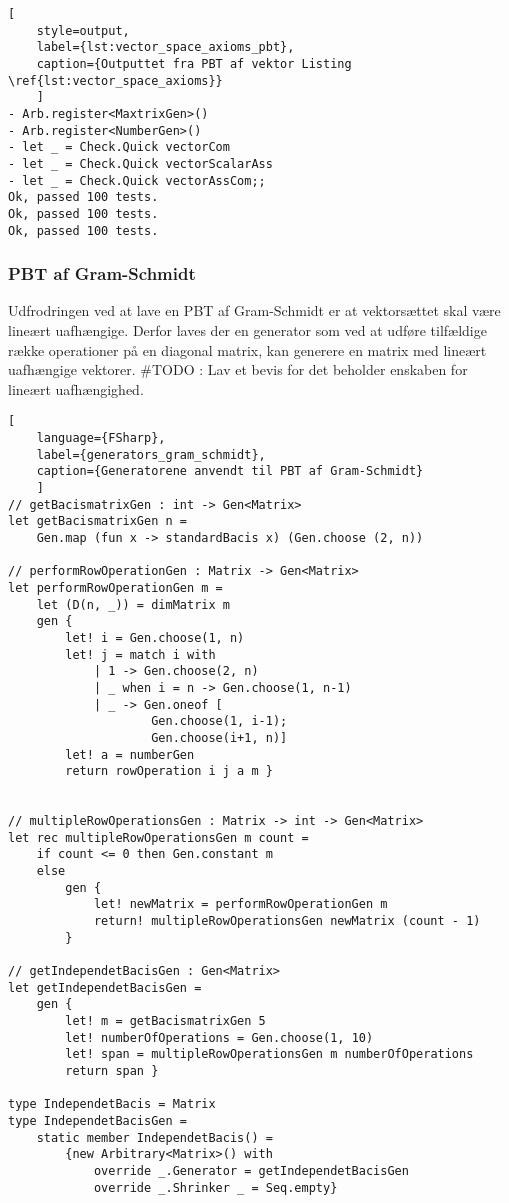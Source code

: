 \begin{lstlisting}[
    style=output, 
    label={lst:vector_space_axioms_pbt}, 
    caption={Outputtet fra PBT af vektor Listing \ref{lst:vector_space_axioms}}
    ]
- Arb.register<MaxtrixGen>()
- Arb.register<NumberGen>()
- let _ = Check.Quick vectorCom
- let _ = Check.Quick vectorScalarAss
- let _ = Check.Quick vectorAssCom;;
Ok, passed 100 tests.
Ok, passed 100 tests.
Ok, passed 100 tests.
\end{lstlisting}

\subsubsection{PBT af Gram-Schmidt}\label{sec:pbt_gram_schmidt}
Udfrodringen ved at lave en PBT af Gram-Schmidt er at vektorsættet skal være lineært uafhængige. Derfor laves der en generator som ved at udføre tilfældige række operationer på en diagonal matrix, kan generere en matrix med lineært uafhængige vektorer. 
\#TODO : Lav et bevis for det beholder enskaben for lineært uafhængighed.

\begin{lstlisting}[
    language={FSharp}, 
    label={generators_gram_schmidt}, 
    caption={Generatorene anvendt til PBT af Gram-Schmidt}
    ]
// getBacismatrixGen : int -> Gen<Matrix>
let getBacismatrixGen n =
    Gen.map (fun x -> standardBacis x) (Gen.choose (2, n))

// performRowOperationGen : Matrix -> Gen<Matrix>
let performRowOperationGen m =
    let (D(n, _)) = dimMatrix m
    gen { 
        let! i = Gen.choose(1, n)
        let! j = match i with
            | 1 -> Gen.choose(2, n)
            | _ when i = n -> Gen.choose(1, n-1)
            | _ -> Gen.oneof [
                    Gen.choose(1, i-1); 
                    Gen.choose(i+1, n)]
        let! a = numberGen
        return rowOperation i j a m }


// multipleRowOperationsGen : Matrix -> int -> Gen<Matrix>
let rec multipleRowOperationsGen m count =
    if count <= 0 then Gen.constant m
    else
        gen {
            let! newMatrix = performRowOperationGen m
            return! multipleRowOperationsGen newMatrix (count - 1)
        }

// getIndependetBacisGen : Gen<Matrix>
let getIndependetBacisGen =
    gen { 
        let! m = getBacismatrixGen 5
        let! numberOfOperations = Gen.choose(1, 10)
        let! span = multipleRowOperationsGen m numberOfOperations
        return span }

type IndependetBacis = Matrix
type IndependetBacisGen =
    static member IndependetBacis() =
        {new Arbitrary<Matrix>() with
            override _.Generator = getIndependetBacisGen
            override _.Shrinker _ = Seq.empty}
\end{lstlisting}

